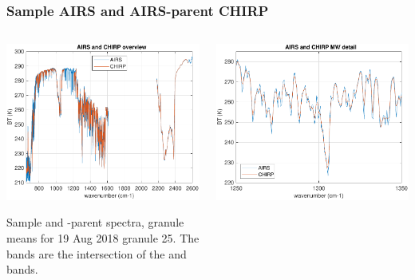 \documentclass[9pt]{beamer}
\begin{document}
\begin{frame}
\frametitle{Sample AIRS and AIRS-parent CHIRP}
\begin{columns}[t]
\begin{column}{0.5\textwidth}  
  \begin{centering}
  \includegraphics[width=\textwidth]{figures/airs_and_chirp_overview.pdf}
  \end{centering}\vspace{3mm}

Sample {\airs} and {\airs}-parent {\chirp} spectra, granule means
for 19 Aug 2018 granule 25.  The {\chirp} bands are the intersection
of the {\airs} and {\cris} bands.

\end{column}

\begin{column}{0.5\textwidth}
  \begin{centering}
  \includegraphics[width=\textwidth]{figures/airs_and_chirp_mw_detail.pdf}
  \end{centering}\vspace{3mm}


\end{column}
\end{columns}
\end{frame}
\end{document}
